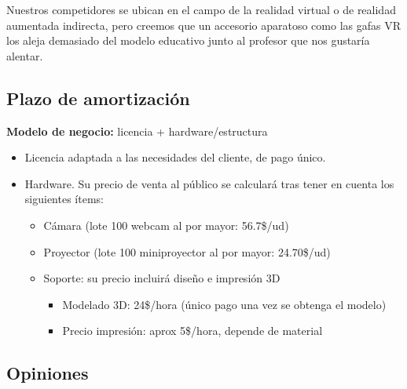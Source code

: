 Nuestros competidores se ubican en el campo de la realidad virtual o de realidad
aumentada indirecta, pero creemos que un accesorio aparatoso como
las gafas VR los aleja demasiado del modelo educativo junto al
profesor que nos gustaría alentar.

\pagebreak
\subsection{Plazo de amortización}
\textbf{Modelo de negocio:} licencia + hardware/estructura
\begin{itemize}
	\item Licencia adaptada a las necesidades del cliente, de pago único.
	\item Hardware. Su precio de venta al público se calculará tras tener en cuenta los siguientes ítems:
	\begin{itemize}
		\item Cámara (lote 100 webcam al por mayor: 56.7\$/ud)
		\item Proyector (lote 100 miniproyector al por mayor:
		24.70\$/ud)
		\item Soporte: su precio incluirá diseño e impresión 3D
		\begin{itemize}
			\item Modelado 3D: 24\$/hora (único pago una vez se obtenga el modelo)
			\item Precio impresión: aprox 5\$/hora, depende de material
		\end{itemize}
	\end{itemize}
\end{itemize}

\subsection{Opiniones}

